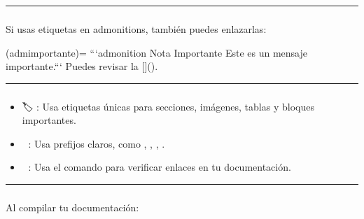 \documentclass[a4paper,10pt,spanish]{sphinxmanual}
\begin{document}
\bigskip\hrule\bigskip



\subsubsection{}
\label{\detokenize{configuracion_inicial/013.guia_de_myst_parser:referencias-a-admonitions}}
\sphinxAtStartPar
Si usas etiquetas en admonitions, también puedes enlazarlas:

\begin{sphinxVerbatim}[commandchars=\\\{\}]
(adm\PYGZhy{}importante)=
	```\PYGZob{}admonition\PYGZcb{} Nota Importante
	Este es un mensaje importante.```
Puedes revisar la []().
\end{sphinxVerbatim}


\bigskip\hrule\bigskip



\subsubsection{}
\label{\detokenize{configuracion_inicial/013.guia_de_myst_parser:buenas-practicas-para-referencias-cruzadas}}\begin{itemize}
\item {} 
\sphinxAtStartPar
🏷️ : Usa etiquetas únicas para secciones, imágenes, tablas y bloques importantes.

\item {} 
\sphinxAtStartPar
🔗 : Usa prefijos claros, como , , , .

\item {} 
\sphinxAtStartPar
📝 : Usa el comando  para verificar enlaces en tu documentación.

\end{itemize}


\bigskip\hrule\bigskip



\subsubsection{}
\label{\detokenize{configuracion_inicial/013.guia_de_myst_parser:verificar-referencias-cruzadas}}
\sphinxAtStartPar
Al compilar tu documentación:
\end{document}

